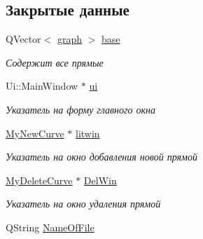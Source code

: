 \subsection*{Закрытые данные}
\begin{DoxyCompactItemize}
\item 
Q\+Vector$<$ \hyperlink{classgraph}{graph} $>$ \hyperlink{class_main_window_a3413d4508f4981518b1b8ebf3b29121e}{base}\hypertarget{class_main_window_a3413d4508f4981518b1b8ebf3b29121e}{}\label{class_main_window_a3413d4508f4981518b1b8ebf3b29121e}

\begin{DoxyCompactList}\small\item\em Содержит все прямые \end{DoxyCompactList}\item 
Ui\+::\+Main\+Window $\ast$ \hyperlink{class_main_window_a35466a70ed47252a0191168126a352a5}{ui}\hypertarget{class_main_window_a35466a70ed47252a0191168126a352a5}{}\label{class_main_window_a35466a70ed47252a0191168126a352a5}

\begin{DoxyCompactList}\small\item\em Указатель на форму главного окна \end{DoxyCompactList}\item 
\hyperlink{class_my_new_curve}{My\+New\+Curve} $\ast$ \hyperlink{class_main_window_a974a3a4a0c5646eca195d209856079dc}{litwin}\hypertarget{class_main_window_a974a3a4a0c5646eca195d209856079dc}{}\label{class_main_window_a974a3a4a0c5646eca195d209856079dc}

\begin{DoxyCompactList}\small\item\em Указатель на окно добавления новой прямой \end{DoxyCompactList}\item 
\hyperlink{class_my_delete_curve}{My\+Delete\+Curve} $\ast$ \hyperlink{class_main_window_a2f05d7f42a79bcda8f6e0fd216bf20d0}{Del\+Win}\hypertarget{class_main_window_a2f05d7f42a79bcda8f6e0fd216bf20d0}{}\label{class_main_window_a2f05d7f42a79bcda8f6e0fd216bf20d0}

\begin{DoxyCompactList}\small\item\em Указатель на окно удаления прямой \end{DoxyCompactList}\item 
Q\+String \hyperlink{class_main_window_a212db452b7d30710f776bc89a0a7e3ea}{Name\+Of\+File}\hypertarget{class_main_window_a212db452b7d30710f776bc89a0a7e3ea}{}\label{class_main_window_a212db452b7d30710f776bc89a0a7e3ea}


\end{DoxyCompactItemize}
